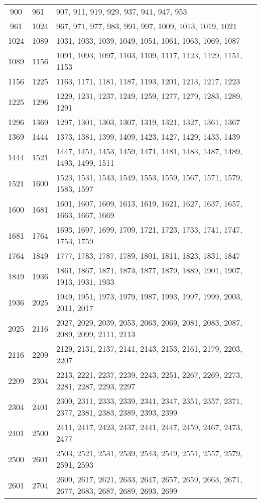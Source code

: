 \documentclass[12pt]{article}
\begin{document}
\begin{tabular}{|c|l|l|}
900 & 961 & 907, 911, 919, 929, 937, 941, 947, 953 \\
961 & 1024 & 967, 971, 977, 983, 991, 997, 1009, 1013, 1019, 1021 \\
1024 & 1089 & 1031, 1033, 1039, 1049, 1051, 1061, 1063, 1069, 1087 \\
1089 & 1156 & 1091, 1093, 1097, 1103, 1109, 1117, 1123, 1129, 1151, 1153 \\
1156 & 1225 & 1163, 1171, 1181, 1187, 1193, 1201, 1213, 1217, 1223 \\
1225 & 1296 & 1229, 1231, 1237, 1249, 1259, 1277, 1279, 1283, 1289, 1291 \\
1296 & 1369 & 1297, 1301, 1303, 1307, 1319, 1321, 1327, 1361, 1367 \\
1369 & 1444 & 1373, 1381, 1399, 1409, 1423, 1427, 1429, 1433, 1439 \\
1444 & 1521 & 1447, 1451, 1453, 1459, 1471, 1481, 1483, 1487, 1489, 1493, 1499, 1511 \\
1521 & 1600 & 1523, 1531, 1543, 1549, 1553, 1559, 1567, 1571, 1579, 1583, 1597 \\
1600 & 1681 & 1601, 1607, 1609, 1613, 1619, 1621, 1627, 1637, 1657, 1663, 1667, 1669 \\
1681 & 1764 & 1693, 1697, 1699, 1709, 1721, 1723, 1733, 1741, 1747, 1753, 1759 \\
1764 & 1849 & 1777, 1783, 1787, 1789, 1801, 1811, 1823, 1831, 1847 \\
1849 & 1936 & 1861, 1867, 1871, 1873, 1877, 1879, 1889, 1901, 1907, 1913, 1931, 1933 \\
1936 & 2025 & 1949, 1951, 1973, 1979, 1987, 1993, 1997, 1999, 2003, 2011, 2017 \\
2025 & 2116 & 2027, 2029, 2039, 2053, 2063, 2069, 2081, 2083, 2087, 2089, 2099, 2111, 2113 \\
2116 & 2209 & 2129, 2131, 2137, 2141, 2143, 2153, 2161, 2179, 2203, 2207 \\
2209 & 2304 & 2213, 2221, 2237, 2239, 2243, 2251, 2267, 2269, 2273, 2281, 2287, 2293, 2297 \\
2304 & 2401 & 2309, 2311, 2333, 2339, 2341, 2347, 2351, 2357, 2371, 2377, 2381, 2383, 2389, 2393, 2399 \\
2401 & 2500 & 2411, 2417, 2423, 2437, 2441, 2447, 2459, 2467, 2473, 2477 \\
2500 & 2601 & 2503, 2521, 2531, 2539, 2543, 2549, 2551, 2557, 2579, 2591, 2593 \\
2601 & 2704 & 2609, 2617, 2621, 2633, 2647, 2657, 2659, 2663, 2671, 2677, 2683, 2687, 2689, 2693, 2699 \\

\end{tabular}
\end{document}
